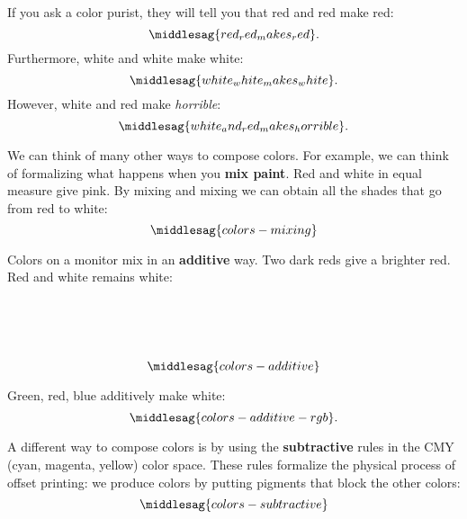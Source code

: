 If you ask a color purist, they will tell you that red and red make red:
%
\begin{equation}
	\middlesag{red_red_makes_red}.
\end{equation}
%
Furthermore, white and white make white:
%
\begin{equation}
	\middlesag{white_white_makes_white}.
\end{equation}
%
However, white and red make \emph{horrible}:
%
\begin{equation}
	\middlesag{white_and_red_makes_horrible}.
\end{equation}


We can think of many other ways to compose colors.
For example, we can think of formalizing what happens when you \textbf{mix paint}.
Red and white in equal measure give pink.
By mixing and mixing we can obtain all the shades that go from red to white:
\begin{equation}
	\label{eq:colors-mixing}
	\middlesag{colors-mixing}
\end{equation}

Colors on a monitor mix in an \textbf{additive} way.
Two dark reds give a brighter red.
Red and white remains white:
%
\begin{widepar}
	\begin{equation}
		\label{eq:colors-additive}
		\rule{0pt}{2cm}\middlesag{colors-additive} %
	\end{equation}
\end{widepar}

Green, red, blue additively make white:
\begin{equation}
	\label{eq:colors-additive-rgb}
	\middlesag{colors-additive-rgb}.
\end{equation}

A different way to compose colors is by using the \textbf{subtractive} rules in the CMY (cyan, magenta, yellow) color space.
These rules formalize the physical process of offset printing: we produce colors by putting pigments that block the other colors:
\begin{equation}
	\label{eq:colors_subtractive}
	\middlesag{colors-subtractive}
\end{equation}

